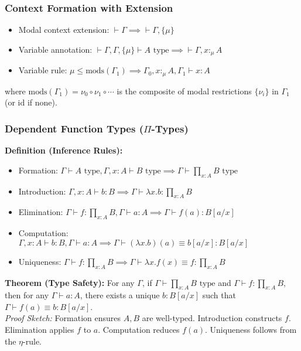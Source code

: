 \documentclass{article}
\begin{document}
\subsubsection{Context Formation with Extension}
\begin{itemize}
    \item Modal context extension: $\vdash \Gamma \implies \vdash \Gamma, \{\mu\}$
    \item Variable annotation: $\vdash \Gamma, \Gamma, \{\mu\} \vdash A \text{ type} \implies \vdash \Gamma, x :_\mu A$
    \item Variable rule: $\mu \leq \text{mods}(\Gamma_1) \implies \Gamma_0, x :_\mu A, \Gamma_1 \vdash x : A$
\end{itemize}
where $\text{mods}(\Gamma_1) = \nu_0 \circ \nu_1 \circ \cdots$ is the composite of modal restrictions $\{\nu_i\}$ in $\Gamma_1$ (or $\text{id}$ if none).

\subsubsection{Dependent Function Types ($\Pi$-Types)}
\textbf{Definition (Inference Rules):}
\begin{itemize}
    \item Formation: $\Gamma \vdash A \text{ type}, \Gamma, x : A \vdash B \text{ type} \implies \Gamma \vdash \prod_{x : A} B \text{ type}$
    \item Introduction: $\Gamma, x : A \vdash b : B \implies \Gamma \vdash \lambda x. b : \prod_{x : A} B$
    \item Elimination: $\Gamma \vdash f : \prod_{x : A} B, \Gamma \vdash a : A \implies \Gamma \vdash f(a) : B[a / x]$
    \item Computation: $\Gamma, x : A \vdash b : B, \Gamma \vdash a : A \implies \Gamma \vdash (\lambda x. b)(a) \equiv b[a / x] : B[a / x]$
    \item Uniqueness: $\Gamma \vdash f : \prod_{x : A} B \implies \Gamma \vdash \lambda x. f(x) \equiv f : \prod_{x : A} B$
\end{itemize}

\textbf{Theorem (Type Safety):}
For any $\Gamma$, if $\Gamma \vdash \prod_{x : A} B \text{ type}$ and $\Gamma \vdash f : \prod_{x : A} B$, then for any $\Gamma \vdash a : A$, there exists a unique $b : B[a / x]$ such that $\Gamma \vdash f(a) \equiv b : B[a / x]$. \\
\textit{Proof Sketch:} Formation ensures $A, B$ are well-typed. Introduction constructs $f$. Elimination applies $f$ to $a$. Computation reduces $f(a)$. Uniqueness follows from the $\eta$-rule.
\end{document}
